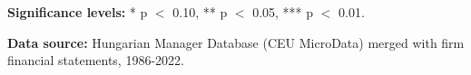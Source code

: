 \begin{table}[htbp]
\begin{threeparttable}
\begin{tablenotes}
\item \textbf{Significance levels:} * p $<$ 0.10, ** p $<$ 0.05, *** p $<$ 0.01.
\item \textbf{Data source:} Hungarian Manager Database (CEU MicroData) merged with firm financial statements, 1986-2022.
\end{tablenotes}
\end{threeparttable}
\end{table}
